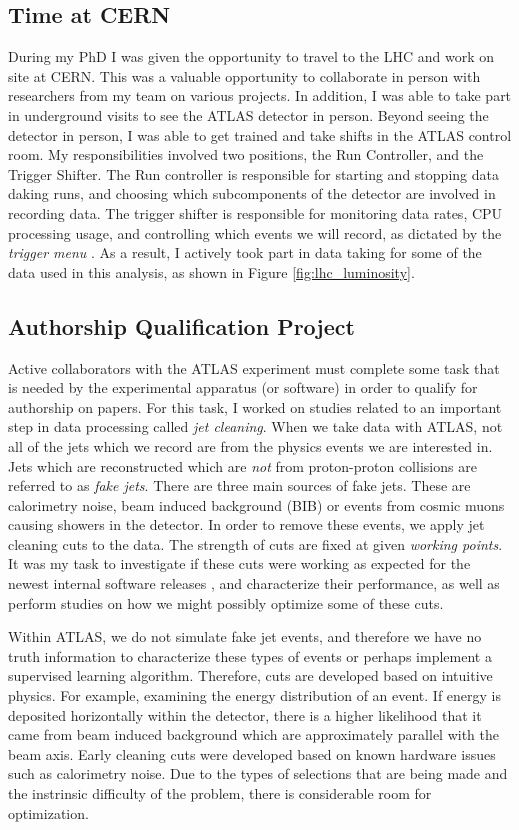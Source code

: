 \documentclass[12pt]{article}
\begin{document}
\subsection{Time at CERN}
During my PhD I was given the opportunity to travel to the LHC and work on site
at CERN. This was a valuable opportunity to collaborate in person with
researchers from my team on various projects. In addition, I was able to take
part in underground visits to see the ATLAS detector in person. Beyond seeing
the detector in person, I was able to get trained and take shifts in the ATLAS
control room. My responsibilities involved two positions, the Run Controller,
and the Trigger Shifter. The Run controller is responsible for starting and
stopping data daking runs, and choosing which subcomponents of the detector are
involved in recording data. The trigger shifter is responsible for monitoring
data rates, CPU processing usage, and controlling which events we will record,
as dictated by the \textit{trigger menu} \cite{trigger_2017, HLT_2016}. As a
result, I actively took part in data taking for some of the data used in this
analysis, as shown in Figure \ref{fig:lhc_luminosity}.



\subsection{Authorship Qualification Project}
Active collaborators with the ATLAS experiment must complete some task that is
needed by the experimental apparatus (or software) in order to qualify for
authorship on papers. For this task, I worked on studies related to an important
step in data processing called \textit{jet cleaning}. When we take data with
ATLAS, not all of the jets which we record are from the physics events we are
interested in. Jets which are reconstructed which are \textit{not} from
proton-proton collisions are referred to as \textit{fake jets}. There are three
main sources of fake jets. These are calorimetry noise, beam induced background
(BIB) or events from cosmic muons causing showers in the detector. In order to
remove these events, we apply jet cleaning cuts to the data. The strength of
cuts are fixed at given \textit{working points}. It was my task to investigate
if these cuts were working as expected for the newest internal software releases
\cite{atlas_simulation}, and characterize their performance, as well as perform
studies on how we might possibly optimize some of these cuts.

Within ATLAS, we do not simulate fake jet events, and therefore we
have no truth information to characterize these types of events or perhaps
implement a supervised learning algorithm. Therefore, cuts are developed based
on intuitive physics. For example, examining the energy distribution of an
event. If energy is deposited horizontally within the detector, there is a
higher likelihood that it came from beam induced background which are
approximately parallel with the beam axis. Early cleaning cuts were developed
based on known hardware issues such as calorimetry noise. Due to the types of
selections that are being made and the instrinsic difficulty of the problem,
there is considerable room for optimization. 
\end{document}
